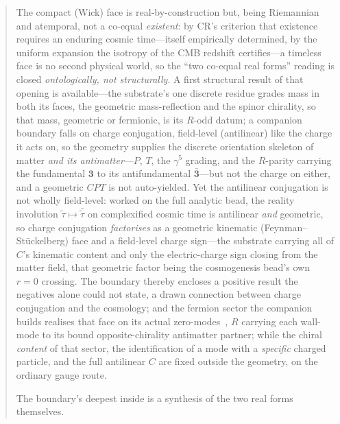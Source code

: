\documentclass[11pt]{article}
\theoremstyle{plain}
\theoremstyle{remark}
\begin{document}
\begin{abstract}
The compact (Wick) face is real-by-construction but, being Riemannian and atemporal, not a co-equal \emph{existent}: by CR's criterion that existence requires an enduring cosmic time---itself empirically determined, by the uniform expansion the isotropy of the CMB redshift certifies---a timeless face is no second physical world, so the ``two co-equal real forms'' reading is closed \emph{ontologically, not structurally}. A first structural result of that opening is available---the substrate's one discrete residue grades mass in both its faces, the geometric mass-reflection and the spinor chirality, so that mass, geometric or fermionic, is its $R$-odd datum; a companion boundary falls on charge conjugation, field-level (antilinear) like the charge it acts on, so the geometry supplies the discrete orientation skeleton of matter \emph{and its antimatter}---$P$, $T$, the $\gamma^5$ grading, and the $R$-parity carrying the fundamental $\mathbf 3$ to its antifundamental $\bar{\mathbf 3}$---but not the charge on either, and a geometric $CPT$ is not auto-yielded. Yet the antilinear conjugation is not wholly field-level: worked on the full analytic bead, the reality involution $\tilde\tau\mapsto\bar{\tilde\tau}$ on complexified cosmic time is antilinear \emph{and} geometric, so charge conjugation \emph{factorises} as a geometric kinematic (Feynman--St\"uckelberg) face and a field-level charge sign---the substrate carrying all of $C$'s kinematic content and only the electric-charge sign closing from the matter field, that geometric factor being the cosmogenesis bead's own $r=0$ crossing. The boundary thereby encloses a positive result the negatives alone could not state, a drawn connection between charge conjugation and the cosmology; and the fermion sector the companion builds realises that face on its actual zero-modes~\cite{JanzenMatter}, $R$ carrying each wall-mode to its bound opposite-chirality antimatter partner; while the chiral \emph{content} of that sector, the identification of a mode with a \emph{specific} charged particle, and the full antilinear $C$ are fixed outside the geometry, on the ordinary gauge route. 

The boundary's deepest inside is a synthesis of the two real forms themselves. 


\end{abstract}
\end{document}
